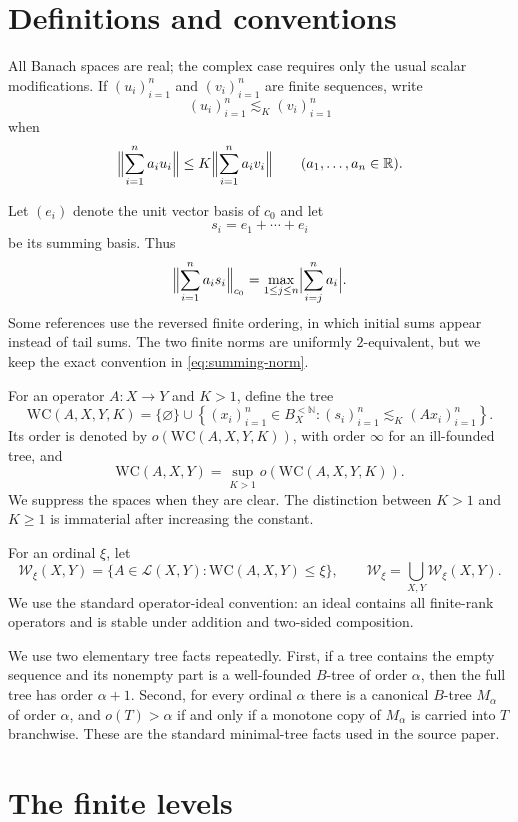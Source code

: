 \documentclass[11pt]{article}
\theoremstyle{definition}
\theoremstyle{remark}
\newcommand{\WC}{\mathrm{WC}}
\newcommand{\N}{\mathbb N}
\newcommand{\R}{\mathbb R}
\newcommand{\cW}{\mathcal W}
\begin{document}
\tableofcontents

\section{Definitions and conventions}

All Banach spaces are real; the complex case requires only the usual scalar modifications.  If $(u_i)_{i=1}^n$ and $(v_i)_{i=1}^n$ are finite sequences, write
\[
   (u_i)_{i=1}^n\lesssim_K(v_i)_{i=1}^n
\]
when
\[
   \Bigl\|\sum_{i=1}^n a_i u_i\Bigr\|
   \leq K\Bigl\|\sum_{i=1}^n a_i v_i\Bigr\|
   \qquad(a_1,\dots,a_n\in\R).
\]

Let $(e_i)$ denote the unit vector basis of $c_0$ and let
\[
   s_i=e_1+\cdots+e_i
\]
be its summing basis.  Thus
\begin{equation}\label{eq:summing-norm}
   \Bigl\|\sum_{i=1}^n a_i s_i\Bigr\|_{c_0}
   =\max_{1\leq j\leq n}\Bigl|\sum_{i=j}^n a_i\Bigr|.
\end{equation}
Some references use the reversed finite ordering, in which initial sums appear instead of tail sums.  The two finite norms are uniformly $2$-equivalent, but we keep the exact convention in \eqref{eq:summing-norm}.

For an operator $A:X\to Y$ and $K>1$, define the tree
\[
 \WC(A,X,Y,K)=\{\varnothing\}\cup
 \left\{(x_i)_{i=1}^n\in B_X^{<\N}:
       (s_i)_{i=1}^n\lesssim_K(Ax_i)_{i=1}^n\right\}.
\]
Its order is denoted by $o(\WC(A,X,Y,K))$, with order $\infty$ for an ill-founded tree, and
\[
   \WC(A,X,Y)=\sup_{K>1}o(\WC(A,X,Y,K)).
\]
We suppress the spaces when they are clear.  The distinction between $K>1$ and $K\geq1$ is immaterial after increasing the constant.

For an ordinal $\xi$, let
\[
   \cW_\xi(X,Y)=\{A\in\mathcal L(X,Y):\WC(A,X,Y)\leq\xi\},
   \qquad
   \cW_\xi=\bigcup_{X,Y}\cW_\xi(X,Y).
\]
We use the standard operator-ideal convention: an ideal contains all finite-rank operators and is stable under addition and two-sided composition.

We use two elementary tree facts repeatedly.  First, if a tree contains the empty sequence and its nonempty part is a well-founded $B$-tree of order $\alpha$, then the full tree has order $\alpha+1$.  Second, for every ordinal $\alpha$ there is a canonical $B$-tree $M_\alpha$ of order $\alpha$, and $o(T)>\alpha$ if and only if a monotone copy of $M_\alpha$ is carried into $T$ branchwise.  These are the standard minimal-tree facts used in the source paper.

\section{The finite levels}
\end{document}
